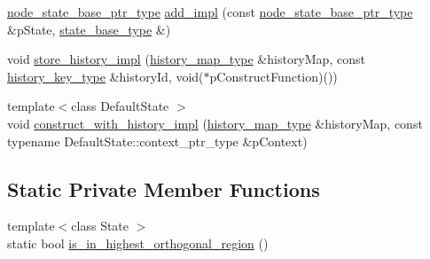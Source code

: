 \begin{DoxyCompactItemize}
\item 
\mbox{\hyperlink{classboost_1_1statechart_1_1state__machine_a5d90f1176309ec8307979aa79dd6f4a3}{node\+\_\+state\+\_\+base\+\_\+ptr\+\_\+type}} \mbox{\hyperlink{classboost_1_1statechart_1_1state__machine_a7e879458268733c24259d71969278ac5}{add\+\_\+impl}} (const \mbox{\hyperlink{classboost_1_1statechart_1_1state__machine_a5d90f1176309ec8307979aa79dd6f4a3}{node\+\_\+state\+\_\+base\+\_\+ptr\+\_\+type}} \&p\+State, \mbox{\hyperlink{classboost_1_1statechart_1_1state__machine_a69cc258c29fcabec25c5dc8bedb7d530}{state\+\_\+base\+\_\+type}} \&)
\item 
void \mbox{\hyperlink{classboost_1_1statechart_1_1state__machine_abb755807d8a21c92ec5484d747b05d14}{store\+\_\+history\+\_\+impl}} (\mbox{\hyperlink{classboost_1_1statechart_1_1state__machine_a9b8fdd7b5af3b0c9143f9d6fb4036ff7}{history\+\_\+map\+\_\+type}} \&history\+Map, const \mbox{\hyperlink{classboost_1_1statechart_1_1state__machine_a4f8e1e85e0ba11488c57318b61950e32}{history\+\_\+key\+\_\+type}} \&history\+Id, void($\ast$p\+Construct\+Function)())
\item 
{\footnotesize template$<$class Default\+State $>$ }\\void \mbox{\hyperlink{classboost_1_1statechart_1_1state__machine_aeb9f786953e992c8a4725404f011395b}{construct\+\_\+with\+\_\+history\+\_\+impl}} (\mbox{\hyperlink{classboost_1_1statechart_1_1state__machine_a9b8fdd7b5af3b0c9143f9d6fb4036ff7}{history\+\_\+map\+\_\+type}} \&history\+Map, const typename Default\+State\+::context\+\_\+ptr\+\_\+type \&p\+Context)
\end{DoxyCompactItemize}
\subsection*{Static Private Member Functions}
\begin{DoxyCompactItemize}
\item 
{\footnotesize template$<$class State $>$ }\\static bool \mbox{\hyperlink{classboost_1_1statechart_1_1state__machine_ad61cc29a03b3adfe91a1ae83864c5229}{is\+\_\+in\+\_\+highest\+\_\+orthogonal\+\_\+region}} ()
\end{DoxyCompactItemize}
